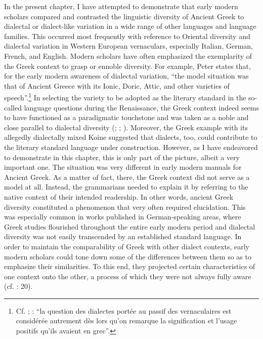 In the present chapter, I have attempted to demonstrate that early modern scholars compared and contrasted the linguistic diversity of Ancient Greek to dialectal or dialect-like variation in a wide range of other languages and language families. This occurred most frequently with reference to Oriental diversity and dialectal variation in Western European vernaculars, especially Italian, German, French, and English. Modern scholars have often emphasized the exemplarity of the Greek context to grasp or ennoble  diversity. For example, Peter \citet[35--36]{Burke2004} states that, for the early modern awareness of dialectal variation, “the model situation was that of Ancient Greece with its Ionic, Doric, Attic, and other varieties of speech”.\footnote{Cf. \citet[923]{Haugen1966}; \citet[216]{Giard1992}: “la question des dialectes portée au passif des vernaculaires est considérée autrement dès lors qu’on remarque la signification et l’usage positifs qu’ils avaient en grec”.} In selecting the variety to be adopted as the literary standard in the so-called language questions during the Renaissance, the Greek context indeed seems to have functioned as a paradigmatic touchstone and was taken as a noble and close parallel to  dialectal diversity (\citealt{Alinei1984}; \citealt{Trovato1984}; \citealt{Trapp1990}). Moreover, the Greek example with its allegedly dialectally mixed Koine suggested that  dialects, too, could contribute to the literary standard language under construction. However, as I have endeavored to demonstrate in this chapter, this is only part of the picture, albeit a very important one. The situation was very different in early modern manuals for Ancient Greek. As a matter of fact, there, the Greek context did not serve as a model at all. Instead, the grammarians needed to explain it by referring to the native  context of their intended readership. In other words, ancient Greek diversity constituted a phenomenon that very often required elucidation. This was especially common in works published in German-speaking areas, where Greek studies flourished throughout the entire early modern period and  dialectal diversity was not easily transcended by an established standard language. In order to maintain the comparability of Greek with other dialect contexts, early modern scholars could tone down some of the differences between them so as to emphasize their similarities. To this end, they projected certain characteristics of one context onto the other, a process of which they were not always fully aware (cf. \citealt{Alinei1980}: 20).

